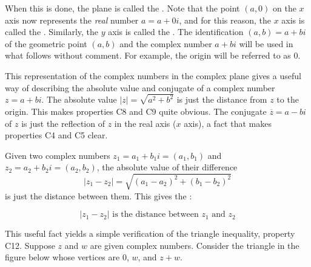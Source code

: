 \documentclass{ximera}
\begin{document}
When this is done, the plane is called the . Note that the point $(a, 0)$ on the $x$ axis now represents the \textit{real} number $a = a + 0i$, and for this reason, the $x$ axis is called the . Similarly, the $y$ axis is called the . The identification $(a, b) = a + bi$ of the geometric point $(a, b)$ and the complex number $a + bi$ will be used in what follows without comment. For example, the origin will be referred to as $0$.

This representation of the complex
numbers in the complex plane gives a useful way of describing the
absolute value and conjugate of a complex number $z = a + bi$. The absolute value $|z| = \sqrt{a^2+b^2}$
 is just the distance from $z$ to the origin. This makes properties C8 and C9 quite obvious. The conjugate $\overline{z} = a-bi$ of $z$ is just the reflection of $z$ in the real axis ($x$ axis), a fact that makes properties C4 and C5 clear.

 \begin{center}
\end{center}

Given two complex numbers $z_{1} = a_{1} + b_{1}i = (a_{1}, b_{1})$ and $z_{2} = a_{2} + b_{2}i = (a_{2}, b_{2})$, the absolute value of their difference
\begin{equation*}
|z_1 - z_2| = \sqrt{(a_1-a_2)^2 + (b_1 - b_2)^2}
\end{equation*}
is just the distance between them. This gives the :

\begin{equation*}
|z_1 - z_2| \mbox{ is the distance between } z_1 \mbox{ and } z_2
\end{equation*}

This useful fact yields a simple verification of the triangle inequality, property C12. Suppose $z$ and $w$ are given complex numbers. Consider the triangle in the figure below whose vertices are $0$, $w$, and $z + w$. 
\end{document}
